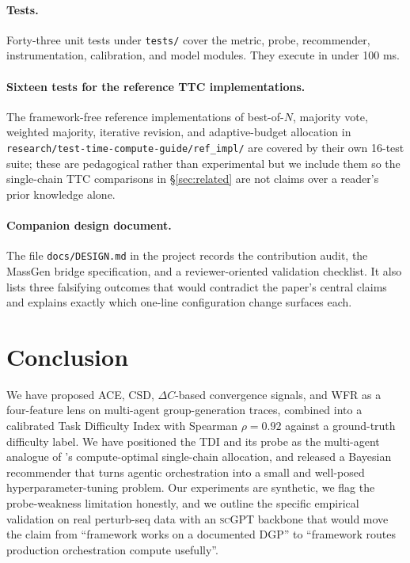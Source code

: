 \documentclass[10pt,a4paper]{article}
\begin{document}
\paragraph{Tests.} Forty-three unit tests under \texttt{tests/} cover the
metric, probe, recommender, instrumentation, calibration, and model modules.
They execute in under 100 ms.

\paragraph{Sixteen tests for the reference TTC implementations.} The
framework-free reference implementations of best-of-$N$, majority vote,
weighted majority, iterative revision, and adaptive-budget allocation in
\texttt{research/test-time-compute-guide/ref\_impl/} are covered by their own
16-test suite; these are pedagogical rather than experimental but we include
them so the single-chain TTC comparisons in \S\ref{sec:related} are not
claims over a reader's prior knowledge alone.

\paragraph{Companion design document.} The file \texttt{docs/DESIGN.md} in
the project records the contribution audit, the MassGen bridge specification,
and a reviewer-oriented validation checklist. It also lists three
falsifying outcomes that would contradict the paper's central claims and
explains exactly which one-line configuration change surfaces each.

\section{Conclusion}\label{sec:conclusion}

We have proposed ACE, CSD, $\Delta C$-based convergence signals, and WFR as a
four-feature lens on multi-agent group-generation traces, combined into a
calibrated Task Difficulty Index with Spearman $\rho\!=\!0.92$ against a
ground-truth difficulty label. We have positioned the TDI and its probe as
the multi-agent analogue of \citet{snell2024scaling}'s compute-optimal
single-chain allocation, and released a Bayesian recommender that turns
agentic orchestration into a small and well-posed hyperparameter-tuning
problem. Our experiments are synthetic, we flag the probe-weakness limitation
honestly, and we outline the specific empirical validation on real
perturb-seq data with an \textsc{scGPT} backbone that would move the claim
from ``framework works on a documented DGP'' to ``framework routes production
orchestration compute usefully''.
\end{document}
